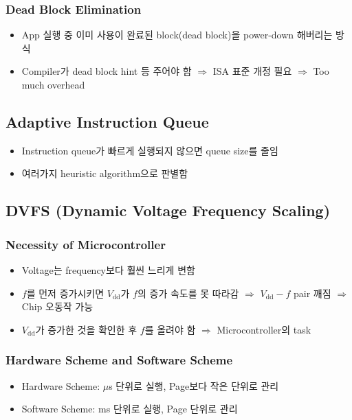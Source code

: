 \subsubsection*{Dead Block Elimination}
\begin{itemize}
    \item App 실행 중 이미 사용이 완료된 block(dead block)을 power-down 해버리는 방식
    \item Compiler가 dead block hint 등 주어야 함 $\Rightarrow$ ISA 표준 개정 필요 $\Rightarrow$ Too much overhead
\end{itemize}
\pagebreak

\subsection{Adaptive Instruction Queue}
\begin{itemize}
    \item Instruction queue가 빠르게 실행되지 않으면 queue size를 줄임
    \item 여러가지 heuristic algorithm으로 판별함
\end{itemize}

\subsection{DVFS (Dynamic Voltage Frequency Scaling)}

\subsubsection*{Necessity of Microcontroller}
\begin{itemize}
    \item Voltage는 frequency보다 훨씬 느리게 변함
    \item $f$를 먼저 증가시키면 $V_{\mathrm{dd}}$가 $f$의 증가 속도를 못 따라감
        $\Rightarrow$ $V_{\mathrm{dd}}-f$ pair 깨짐 $\Rightarrow$ Chip 오동작 가능
    \item $V_{\mathrm{dd}}$가 증가한 것을 확인한 후 $f$를 올려야 함 $\Rightarrow$ Microcontroller의 task
\end{itemize}

\subsubsection*{Hardware Scheme and Software Scheme}
\begin{itemize}
    \item Hardware Scheme: $\mu$s 단위로 실행, Page보다 작은 단위로 관리
    \item Software Scheme: ms 단위로 실행, Page 단위로 관리
\end{itemize}

